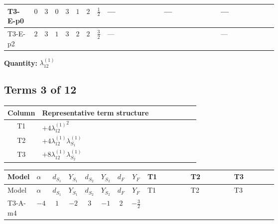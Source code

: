 \documentclass[8pt]{article}
\begin{document}
\begin{landscape}
\begin{longtable}{@{}llcccccc >{\raggedright\arraybackslash}p{0.21\linewidth} >{\raggedright\arraybackslash}p{0.21\linewidth} >{\raggedright\arraybackslash}p{0.21\linewidth}@{}}
\midrule
T3-E-p0 & $0$ & $3$ & $0$ & $3$ & $1$ & $2$ & $\frac{1}{2}$ & --- & --- & --- \\
\midrule
T3-E-p2 & $2$ & $3$ & $1$ & $3$ & $2$ & $2$ & $\frac{3}{2}$ & --- & \scriptsize\adjustbox{max width=\linewidth}{$\begin{gathered} +48 {g_1}^4\end{gathered}$} & --- \\
\midrule
\bottomrule
\end{longtable}
\clearpage
\noindent\textbf{Quantity: }$\lambda_{12}^{(1)}$\par\smallskip
\subsection*{Terms 3 of 12}
\begin{center}
\begin{tabular}{@{}c >{\raggedright\arraybackslash}p{0.82\linewidth}@{}}
\toprule
Column & Representative term structure \\
\midrule
T1 & \(\displaystyle +4 {\lambda_{12}^{(1)}}^2\) \\
\midrule
T2 & \(\displaystyle +4 {\lambda_{12}^{(1)}} {\lambda_{S_1}^{(1)}}\) \\
\midrule
T3 & \(\displaystyle +8 {\lambda_{12}^{(1)}} {\lambda_{S_2}^{(1)}}\) \\
\midrule
\bottomrule
\end{tabular}
\end{center}
\smallskip
\tiny
\begin{longtable}{@{}llcccccc >{\raggedright\arraybackslash}p{0.21\linewidth} >{\raggedright\arraybackslash}p{0.21\linewidth} >{\raggedright\arraybackslash}p{0.21\linewidth}@{}}
\toprule
Model & $\alpha$ & $d_{S_1}$ & $Y_{S_1}$ & $d_{S_2}$ & $Y_{S_2}$ & $d_F$ & $Y_F$ & T1 & T2 & T3 \\
\midrule
\endfirsthead
\toprule
Model & $\alpha$ & $d_{S_1}$ & $Y_{S_1}$ & $d_{S_2}$ & $Y_{S_2}$ & $d_F$ & $Y_F$ & T1 & T2 & T3 \\
\midrule
\endhead
T3-A-m4 & $-4$ & $1$ & $-2$ & $3$ & $-1$ & $2$ & $-\frac{3}{2}$ & \scriptsize\adjustbox{max width=\linewidth}{$\begin{gathered} +4 {\lambda_{12}^{(1)}}^2\end{gathered}$} & \scriptsize\adjustbox{max width=\linewidth}{$\begin{gathered} +4 {\lambda_{12}^{(1)}} {\lambda_{S_1}^{(1)}}\end{gathered}$} & \scriptsize\adjustbox{max width=\linewidth}{$\begin{gathered} +8 {\lambda_{12}^{(1)}} {\lambda_{S_2}^{(1)}}\end{gathered}$} \\

\end{longtable}
\end{landscape}
\end{document}
